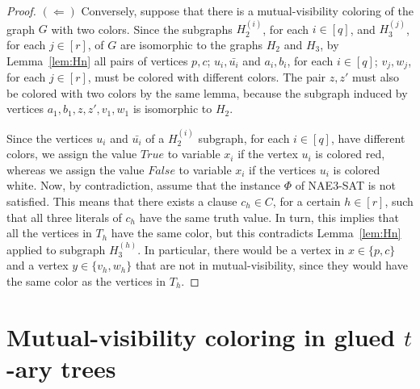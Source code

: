 \documentclass[12pt]{article}
\begin{document}
\begin{proof}
 \bigskip
 $(\Leftarrow)$ Conversely, suppose that there is a mutual-visibility coloring of the graph $G$ with two colors. Since the subgraphs $H_2^{(i)}$, for each $i\in[q]$, and $H_3^{(j)}$, for each $j\in [r]$, of $G$ are isomorphic
to the graphs $H_2$ and $H_3$, by Lemma~\ref{lem:Hn} all pairs of vertices $p,c$; $u_i,\bar{u_i}$ and $a_i,b_i$,  for each $i\in[q]$; $v_j,w_j$, for each $j\in [r]$, must be colored with different colors. The pair $z,z'$ must also be colored with two colors by the same lemma, because the subgraph induced by vertices $a_1,b_1, z,z',v_1,w_1$ is isomorphic to $H_2$. 

Since the vertices $u_i$ and $\bar{u_i}$ of a $H_2^{(i)}$ subgraph, for each $i\in[q]$, have different colors, we assign the value $True$ to variable $x_i$ if the vertex $u_{i}$ is colored red, whereas we assign the value $False$ to variable $x_i$ if the vertices $u_{i}$  is colored white. Now, by contradiction, assume that the instance $\Phi$ of {\sc NAE3-SAT} is not satisfied. This means that there exists a clause $c_h\in C$, for a certain $h\in[r]$, such that all three literals of $c_h$ have the same truth value. In turn, this implies that all the vertices in $T_h$ have the same color, but this contradicts Lemma~\ref{lem:Hn} applied to subgraph $H_3^{(h)}$. In particular, there would be a vertex in $x\in\{p,c\}$ and a vertex $y\in \{v_h,w_h\}$ that are not in mutual-visibility, since they would have the same color as the vertices in $T_h$.
\end{proof}

\section{Mutual-visibility coloring in glued $t$-ary trees}
\end{document}
